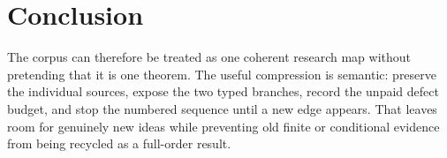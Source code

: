 \documentclass[11pt]{article}
\theoremstyle{definition}
\theoremstyle{remark}
\begin{document}
\section{Conclusion}

The corpus can therefore be treated as one coherent research map without
pretending that it is one theorem.  The useful compression is semantic:
preserve the individual sources, expose the two typed branches, record the
unpaid defect budget, and stop the numbered sequence until a new edge appears.
That leaves room for genuinely new ideas while preventing old finite or
conditional evidence from being recycled as a full-order result.
\end{document}
